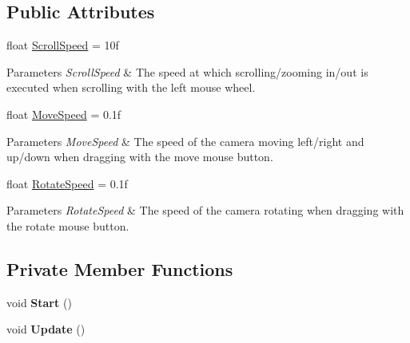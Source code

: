 \subsection*{Public Attributes}
\begin{DoxyCompactItemize}
\item 
\mbox{\label{class_camera_movement_ab0c3a10c369ffb355282c53bf8e25fc1}} 
float \hyperlink{class_camera_movement_ab0c3a10c369ffb355282c53bf8e25fc1}{Scroll\+Speed} = 10f
\begin{DoxyCompactList}\small\item\em 
\begin{DoxyParams}{Parameters}
{\em Scroll\+Speed} & The speed at which scrolling/zooming in/out is executed when scrolling with the left mouse wheel.\\
\hline
\end{DoxyParams}
\end{DoxyCompactList}\item 
\mbox{\label{class_camera_movement_ac23a09cdd06272b43e5090681e09095a}} 
float \hyperlink{class_camera_movement_ac23a09cdd06272b43e5090681e09095a}{Move\+Speed} = 0.\+1f
\begin{DoxyCompactList}\small\item\em 
\begin{DoxyParams}{Parameters}
{\em Move\+Speed} & The speed of the camera moving left/right and up/down when dragging with the move mouse button.\\
\hline
\end{DoxyParams}
\end{DoxyCompactList}\item 
\mbox{\label{class_camera_movement_a0f6b3942fca01de3080b2728274ac102}} 
float \hyperlink{class_camera_movement_a0f6b3942fca01de3080b2728274ac102}{Rotate\+Speed} = 0.\+1f
\begin{DoxyCompactList}\small\item\em 
\begin{DoxyParams}{Parameters}
{\em Rotate\+Speed} & The speed of the camera rotating when dragging with the rotate mouse button.\\
\hline
\end{DoxyParams}
\end{DoxyCompactList}\end{DoxyCompactItemize}
\subsection*{Private Member Functions}
\begin{DoxyCompactItemize}
\item 
\mbox{\label{class_camera_movement_a3d5bf0407152d0e16efafa655bfc15e9}} 
void {\bfseries Start} ()
\item 
\mbox{\label{class_camera_movement_a6d70b582440500fff98506ebd3e9050e}} 
void {\bfseries Update} ()
\end{DoxyCompactItemize}
